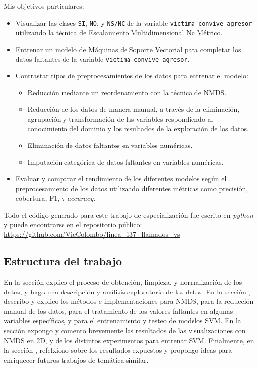 \documentclass[10 pt]{article}
\begin{document}
Mis objetivos particulares:

\begin{itemize}
\item Visualizar las clases \texttt{SI}, \texttt{NO}, y \texttt{NS/NC} de la variable \texttt{victima\_convive\_agresor} utilizando la técnica de Escalamiento Multidimensional No Métrico.
\item Entrenar un modelo de Máquinas de Soporte Vectorial para completar los datos faltantes de la variable \texttt{victima\_convive\_agresor}.
\item Contrastar tipos de preprocesamientos de los datos para entrenar el modelo: 
\begin{itemize}
    \item Reducción mediante un reordenamiento con la técnica de NMDS.
    \item Reducción de los datos de manera manual, a través de la eliminación, agrupación y transformación de las variables respondiendo al conocimiento del dominio y los resultados de la exploración de los datos. 
    \item Eliminación de datos faltantes en variables numéricas.
    \item Imputación categórica de datos faltantes en variables numéricas. 
\end{itemize}
\item Evaluar y comparar el rendimiento de los diferentes modelos según el preprocesamiento de los datos utilizando diferentes métricas como precisión, cobertura, F1, y \textit{accuracy}.
    
\end{itemize}


Todo el código generado para este trabajo de especialización fue escrito en \textit{python} y puede encontrarse en el repositorio público: \url{https://github.com/VicColombo/linea_137_llamados_vs}

\subsection{Estructura del trabajo}

En la sección  explico el proceso de obtención, limpieza, y normalización de los datos, y hago una descripción y análisis exploratorio de los datos. En la sección , describo y explico los métodos e implementaciones para NMDS, para la reducción manual de los datos, para el tratamiento de los valores faltantes en algunas variables específicas, y para el entrenamiento y testeo de modelos SVM. En la sección  expongo y comento brevemente los resultados de las visualizaciones con NMDS en 2D, y de los distintos experimentos para entrenar SVM. Finalmente, en la sección , refelxiono sobre los resultados expuestos y propongo ideas para enriquecer futuros trabajos de temática similar.
\end{document}
